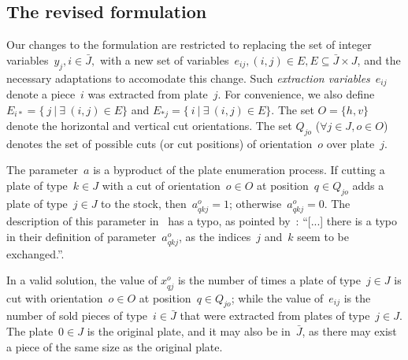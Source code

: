 \documentclass[smallextended]{svjour3}       %
\begin{document}

\subsection{The revised formulation}

Our changes to the formulation are restricted to replacing the set of integer variables~\(y_j, i \in \bar{J},\) with a new set of variables~\(e_{ij}, (i, j) \in E, E \subseteq \bar{J} \times J\), and the necessary adaptations to accomodate this change.
Such \emph{extraction variables}~\(e_{ij}\) denote a piece~\(i\) was extracted from plate~\(j\).
For convenience, we also define \(E_{i*} = \{~j~|~\exists~(i, j) \in E \}\) and \(E_{*j} = \{~i~|~\exists~(i, j) \in E \}\).  
The set \(O = \{h, v\}\) denote the horizontal and vertical cut orientations.
The set \(Q_{jo}\) (\(\forall j \in J, o \in O\)) denotes the set of possible cuts (or cut positions) of orientation~\(o\) over plate~\(j\).

The parameter~\(a\) is a byproduct of the plate enumeration process.
If cutting a plate of type~\(k \in J\) with a cut of orientation~\(o \in O\) at position~\(q \in Q_{jo}\) adds a plate of type~\(j \in J\) to the stock, then~\(a^o_{qkj} = 1\); otherwise~\(a^o_{qkj} = 0\).
The description of this parameter in~\cite{furini:2016} has a typo, as pointed by~\cite{martin:2020}:
``[...] there is a typo in their definition of parameter~\(a^o_{qkj}\), as the indices~\(j\) and~\(k\) seem to be exchanged.''.

In a valid solution, the value of \(x^o_{qj}\) is the number of times a plate of type~\(j \in J\) is cut with orientation~\(o \in O\) at position~\(q \in Q_{jo}\); while the value of~\(e_{ij}\) is the number of sold pieces of type~\(i \in \bar{J}\) that were extracted from plates of type~\(j \in J\).
The plate~\(0 \in J\) is the original plate, and it may also be in~\(\bar{J}\), as there may exist a piece of the same size as the original plate.
\end{document}
